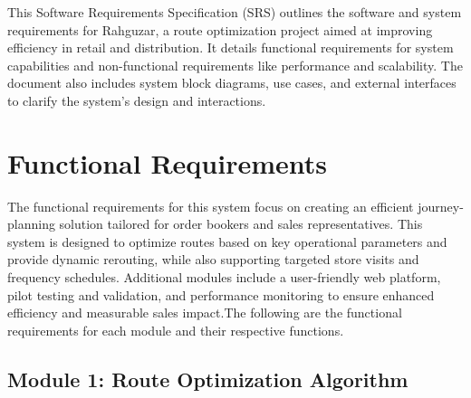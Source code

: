 This Software Requirements Specification (SRS) outlines the software and system requirements for Rahguzar, a route optimization project aimed at improving efficiency in retail and distribution. It details functional requirements for system capabilities and non-functional requirements like performance and scalability. The document also includes system block diagrams, use cases, and external interfaces to clarify the system’s design and interactions.

\section{Functional Requirements}



The functional requirements for this system focus on creating an efficient journey-planning solution tailored for order bookers and sales representatives. This system is designed to optimize routes based on key operational parameters and provide dynamic rerouting, while also supporting targeted store visits and frequency schedules. Additional modules include a user-friendly web platform, pilot testing and validation, and performance monitoring to ensure enhanced efficiency and measurable sales impact.The following are the functional requirements for each module and their respective functions.

\subsection*{Module 1: Route Optimization Algorithm}
